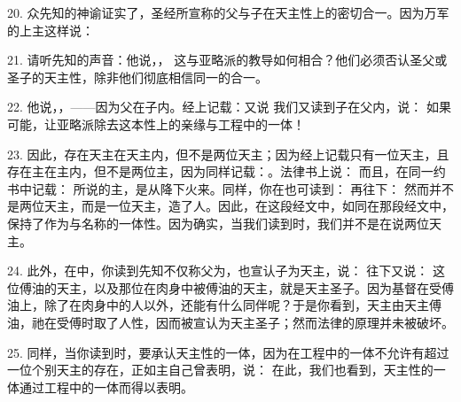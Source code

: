 20. 众先知的神谕证实了，圣经所宣称的父与子在天主性上的密切合一。因为万军的上主这样说：\par

21. 请听先知的声音：他说，， 这与亚略派的教导如何相合？他们必须否认圣父或圣子的天主性，除非他们彻底相信同一的合一。\par

22. 他说，，——因为父在子内。经上记载：又说 我们又读到子在父内，说： 如果可能，让亚略派除去这本性上的亲缘与工程中的一体！\par

23. 因此，存在天主在天主内，但不是两位天主；因为经上记载只有一位天主，且存在主在主内，但不是两位主，因为同样记载：。法律书上说： 而且，在同一约书中记载： 所说的主，是从降下火来。同样，你在也可读到： 再往下： 然而并不是两位天主，而是一位天主，造了人。因此，在这段经文中，如同在那段经文中，保持了作为与名称的一体性。因为确实，当我们读到时，我们并不是在说两位天主。\par

24. 此外，在中，你读到先知不仅称父为，也宣认子为天主，说： 往下又说： 这位傅油的天主，以及那位在肉身中被傅油的天主，就是天主圣子。因为基督在受傅油上，除了在肉身中的人以外，还能有什么同伴呢？于是你看到，天主由天主傅油，祂在受傅时取了人性，因而被宣认为天主圣子；然而法律的原理并未被破坏。\par

25. 同样，当你读到时，要承认天主性的一体，因为在工程中的一体不允许有超过一位个别天主的存在，正如主自己曾表明，说： 在此，我们也看到，天主性的一体通过工程中的一体而得以表明。\par

